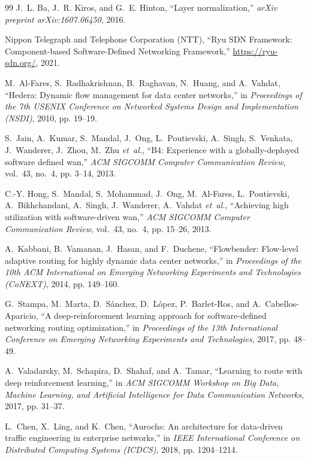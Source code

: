 \documentclass[12pt,a4paper,oneside]{report}
\begin{document}
\begin{thebibliography}{99}
J.~L. Ba, J.~R. Kiros, and G.~E. Hinton, ``Layer normalization,'' \emph{arXiv preprint arXiv:1607.06450}, 2016.

{Nippon Telegraph and Telephone Corporation (NTT)}, ``{Ryu SDN Framework: Component-based Software-Defined Networking Framework},'' \url{https://ryu-sdn.org/}, 2021.

M.~Al-Fares, S.~Radhakrishnan, B.~Raghavan, N.~Huang, and A.~Vahdat, ``Hedera: Dynamic flow management for data center networks,'' in \emph{Proceedings of the 7th USENIX Conference on Networked Systems Design and Implementation (NSDI)}, 2010, pp. 19--19.

S.~Jain, A.~Kumar, S.~Mandal, J.~Ong, L.~Poutievski, A.~Singh, S.~Venkata, J.~Wanderer, J.~Zhou, M.~Zhu \emph{et~al.}, ``B4: Experience with a globally-deployed software defined wan,'' \emph{ACM SIGCOMM Computer Communication Review}, vol.~43, no.~4, pp. 3--14, 2013.

C.-Y. Hong, S.~Mandal, S.~Mohammad, J.~Ong, M.~Al-Fares, L.~Poutievski, A.~Bikhchandani, A.~Singh, J.~Wanderer, A.~Vahdat \emph{et~al.}, ``Achieving high utilization with software-driven wan,'' \emph{ACM SIGCOMM Computer Communication Review}, vol.~43, no.~4, pp. 15--26, 2013.

A.~Kabbani, B.~Vamanan, J.~Hasan, and F.~Duchene, ``Flowbender: Flow-level adaptive routing for highly dynamic data center networks,'' in \emph{Proceedings of the 10th ACM International on Emerging Networking Experiments and Technologies (CoNEXT)}, 2014, pp. 149--160.

G.~Stampa, M.~Marta, D.~S{\'a}nchez, D.~L{\'o}pez, P.~Barlet-Ros, and A.~Cabellos-Aparicio, ``A deep-reinforcement learning approach for software-defined networking routing optimization,'' in \emph{Proceedings of the 13th International Conference on Emerging Networking Experiments and Technologies}, 2017, pp. 48--49.

A.~Valadarsky, M.~Schapira, D.~Shahaf, and A.~Tamar, ``Learning to route with deep reinforcement learning,'' in \emph{ACM SIGCOMM Workshop on Big Data, Machine Learning, and Artificial Intelligence for Data Communication Networks}, 2017, pp. 31--37.

L.~Chen, X.~Ling, and K.~Chen, ``Aurochs: An architecture for data-driven traffic engineering in enterprise networks,'' in \emph{IEEE International Conference on Distributed Computing Systems (ICDCS)}, 2018, pp. 1204--1214.


\end{thebibliography}
\end{document}
